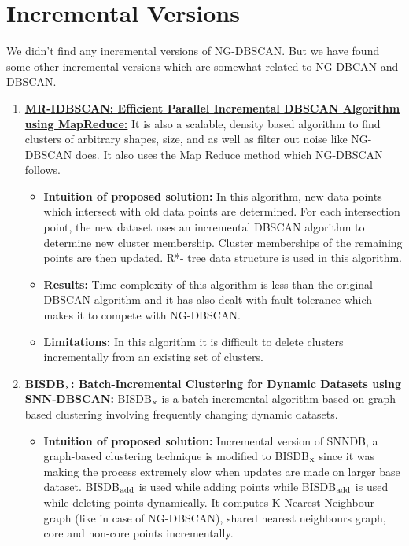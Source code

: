\documentclass[acmsmall]{acmart}
\begin{document}
\section* {Incremental Versions}
We didn't find any incremental versions of NG-DBSCAN. But we have found some other incremental versions which are somewhat related to NG-DBCAN and DBSCAN.
\begin{enumerate}
    \item \textcolor{blue}{\textbf{\href{https://citeseerx.ist.psu.edu/viewdoc/download?doi=10.1.1.678.8143&rep=rep1&type=pdf
    }{MR-IDBSCAN: Efficient Parallel Incremental DBSCAN Algorithm using MapReduce:}}}
    It is also a scalable, density based algorithm to find clusters of arbitrary shapes, size, and as well as filter out noise like NG-DBSCAN does. It also uses the Map Reduce method which NG-DBSCAN follows. 
    \begin{itemize}
        \item \textbf{Intuition of proposed solution:} In this algorithm, new data points which intersect with old data points are determined. For each intersection point, the new dataset uses an incremental DBSCAN algorithm to determine new cluster membership. Cluster memberships of the remaining points are then updated. R*- tree data structure is used in this algorithm.
        \item \textbf{Results:} Time complexity of this algorithm is less than the original DBSCAN	algorithm and it has also dealt with fault tolerance which makes it to compete with NG-DBSCAN.
        \item \textbf{Limitations:} In this algorithm it is difficult to delete clusters incrementally from an existing set of clusters.
    \end{itemize}
    \vspace{5pt}
    \item \textcolor{blue}{\textbf{\href{https://link.springer.com/article/10.1007\%2Fs10044-019-00831-1}{BISDB$\textsubscript{x}$: Batch‑Incremental Clustering for Dynamic Datasets using SNN‑DBSCAN:}}}
    BISDB$\textsubscript{x}$ is a batch-incremental algorithm based on graph based clustering involving frequently changing dynamic datasets.
    \begin{itemize}
        \item \textbf{Intuition of proposed solution:}  Incremental version of SNNDB, a graph-based clustering technique is modified to BISDB$\textsubscript{x}$ since it was making the process extremely slow when updates are made on larger base dataset. BISDB$\textsubscript{add}$ is used while adding points while BISDB$\textsubscript{add}$ is used while deleting points dynamically. It computes K-Nearest Neighbour graph (like in case of NG-DBSCAN), shared nearest neighbours graph, core and non-core points incrementally.

\end{itemize}
\end{enumerate}
\end{document}

